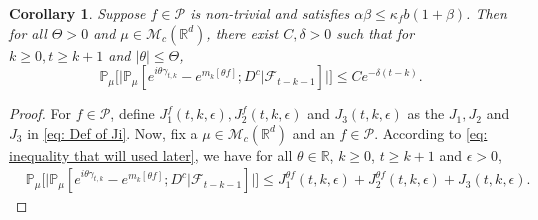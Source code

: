 \documentclass[12pt,a4paper]{amsart}
\theoremstyle{plain}
\newtheorem{cor}[thm]{Corollary}
\theoremstyle{definition}
\numberwithin{equation}{section}
\begin{document}
\begin{cor}\label{cor: used in next corollary}
  Suppose $f\in \mathcal{P}$ is non-trivial and satisfies $\alpha\beta\leq \kappa_fb(1+\beta)$.
  Then for all $\Theta >0$ and $\mu\in \mathcal M_c(\mathbb R^d)$, there exist $C, \delta>0$ such that for $k \geq 0, t\geq k+1$ and $|\theta|\leq \Theta$,
\begin{equation}
  \mathbb{P}_{\mu}\Big[\big|\mathbb{P}_{\mu}[e^{i\theta\gamma_{t,k}}-e^{m_k[\theta f]}; D^c | \mathscr F_{t-k-1}]\big|\Big]
  \leq Ce^{-\delta(t-k)}.
\end{equation}
\end{cor}
\begin{proof}
	For $f\in \mathcal P$, define $J_1^f(t,k,\epsilon), J_2^f(t,k,\epsilon)$ and $J_3(t,k,\epsilon)$ as the $J_1, J_2$ and $J_3$ in \eqref{eq: Def of Ji}.
	Now, fix a $\mu \in \mathcal M_c(\mathbb R^d)$ and an $f\in \mathcal P$.
  According to \eqref{eq: inequality that will used later},  we have for all $\theta\in \mathbb R$, $k\geq 0$, $t\geq k+1$ and $\epsilon> 0$,
  \begin{align}
    & \mathbb{P}_{\mu}\Big[\big| \mathbb{P}_{\mu}[e^{i\theta \gamma_{t,k}}-e^{m_k[\theta f]}; D^c | \mathscr F_{t-k-1}]\big|\Big]
    \leq J^{\theta f}_1(t,k,\epsilon) + J^{\theta f}_2(t,k,\epsilon)+J_3(t,k,\epsilon).
  \end{align}
  

\end{proof}
\end{document}
